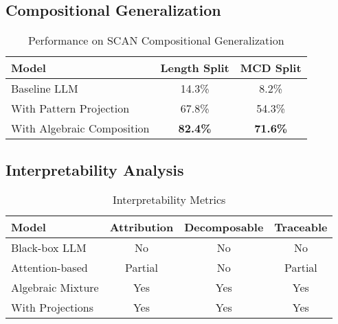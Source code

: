 \documentclass{article}
\theoremstyle{definition}
\begin{document}
\subsection{Compositional Generalization}

\begin{table}[h]
\centering
\caption{Performance on SCAN Compositional Generalization}
\begin{tabular}{lcc}
\toprule
Model & Length Split & MCD Split \\
\midrule
Baseline LLM & 14.3\% & 8.2\% \\
With Pattern Projection & 67.8\% & 54.3\% \\
With Algebraic Composition & \textbf{82.4\%} & \textbf{71.6\%} \\
\bottomrule
\end{tabular}
\end{table}

\subsection{Interpretability Analysis}

\begin{table}[h]
\centering
\caption{Interpretability Metrics}
\begin{tabular}{lccc}
\toprule
Model & Attribution & Decomposable & Traceable \\
\midrule
Black-box LLM & No & No & No \\
Attention-based & Partial & No & Partial \\
Algebraic Mixture & Yes & Yes & Yes \\
With Projections & Yes & Yes & Yes \\
\bottomrule
\end{tabular}
\end{table}
\end{document}
